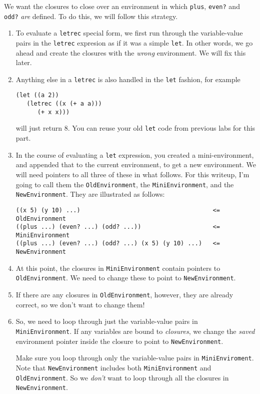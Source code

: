 \documentclass[letterpaper,12pt]{article}
\begin{document}
We want the closures to close over an environment in which \texttt{plus},
\texttt{even?} and \texttt{odd?} \emph{are} defined.  To do this, we will follow
this strategy.
\begin{enumerate}
\item To evaluate a \texttt{letrec} special form, we first run through the
  variable-value pairs in the \texttt{letrec} expresion as if it was a simple
  \texttt{let}.  In other words, we go ahead and create the closures with the
  {\em wrong} environment.  We will fix this later.
\item Anything else in a \texttt{letrec} is also handled in the \texttt{let}
  fashion, for example
\begin{Verbatim}
(let ((a 2))
   (letrec ((x (+ a a)))
      (+ x x)))
\end{Verbatim}
  will just return 8.  You can reuse your old \texttt{let} code from previous
  labs for this part.
\item In the course of evaluating a \texttt{let} expression, you created a
  mini-environment, and appended that to the current environment, to get a new
  environment.  We will need pointers to all three of these in what follows.
  For this writeup, I'm going to call them the \texttt{OldEnvironment}, the
  \texttt{MiniEnvironment}, and the \texttt{NewEnvironment}.  They are
  illustrated as follows:
\begin{Verbatim}
((x 5) (y 10) ...)                                     <= OldEnvironment
((plus ...) (even? ...) (odd? ...))                    <= MiniEnvironment
((plus ...) (even? ...) (odd? ...) (x 5) (y 10) ...)   <= NewEnvironment
\end{Verbatim}
\item At this point, the closures in \texttt{MiniEnvironment} contain pointers
  to \texttt{OldEnvironment}.  We need to change these to point to
  \texttt{NewEnvironment}.
\item If there are any closures in \texttt{OldEnvironment}, however, they are
  already correct, so we don't want to change them!

\item So, we need to loop through just the variable-value pairs in \texttt{
    MiniEnvironment}.  If any variables are bound to \emph{closures}, we change
  the {\em saved} environment pointer inside the closure to point to
  \texttt{NewEnvironment}.

  Make sure you loop through only the variable-value pairs in
  \texttt{MiniEnviroment}. Note that \texttt{NewEnvironment} includes both
  \texttt{MiniEnvironment} and \texttt{OldEnvironment}. So we \emph{don't} want
  to loop through all the closures in \texttt{NewEnvironment}.


\end{enumerate}
\end{document}
